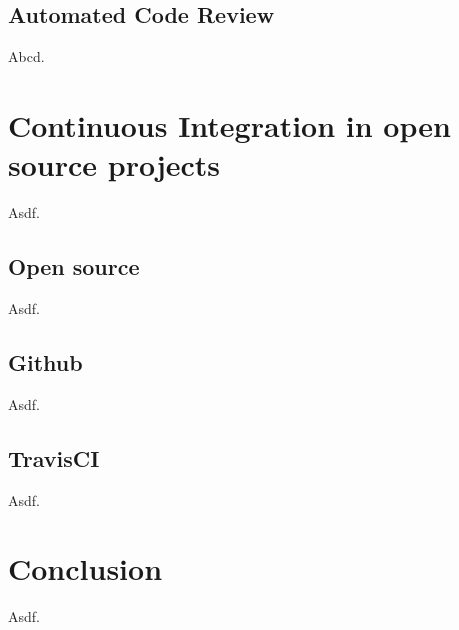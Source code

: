 \section{Automated Code Review}
Abcd.

\chapter{Continuous Integration in open source projects}
Asdf.

\section{Open source}
Asdf.

\section{Github}
Asdf.

\section{TravisCI}
Asdf.

\chapter{Conclusion}
Asdf.

